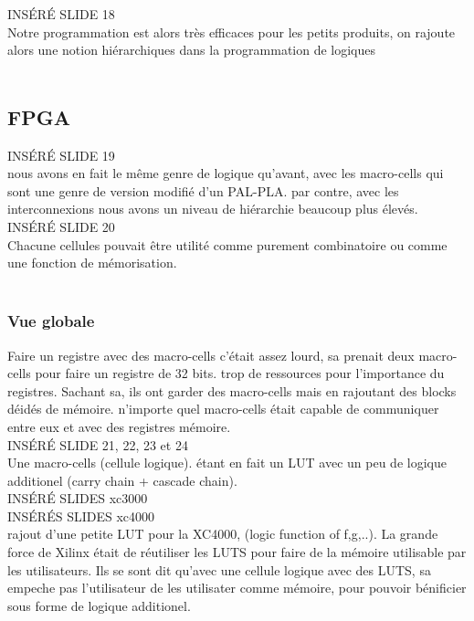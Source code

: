 \documentclass[oneside]{book}
\begin{document}
        INSÉRÉ SLIDE 18\\
        
        Notre programmation est alors très efficaces pour les petits produits, on rajoute alors une notion hiérarchiques dans la programmation de logiques\\
        \\
        \subsection{FPGA}
        INSÉRÉ SLIDE 19\\
        
        nous avons en fait le même genre de logique qu'avant, avec les macro-cells qui sont une genre de version modifié d'un PAL-PLA. par contre, avec les interconnexions nous avons un niveau de hiérarchie beaucoup plus élevés.\\
        
        INSÉRÉ SLIDE 20\\
        
        Chacune cellules pouvait être utilité comme purement combinatoire ou comme une fonction de mémorisation. \\
        \\
        \subsubsection{Vue globale}
        Faire un registre avec des macro-cells c'était assez lourd, sa prenait deux macro-cells pour faire un registre de 32 bits. trop de ressources pour l'importance du registres. Sachant sa, ils ont garder des macro-cells mais en rajoutant des blocks déidés de mémoire. n'importe quel macro-cells était capable de communiquer entre eux et avec des registres mémoire.\\
        
        INSÉRÉ SLIDE 21, 22, 23 et 24\\
        
        Une macro-cells (cellule logique). étant en fait un LUT avec un peu de logique additionel (carry chain + cascade chain). 
        \\
        
        INSÉRÉ SLIDES xc3000\\
        
        INSÉRÉS SLIDES xc4000\\
        
        rajout d'une petite LUT pour la XC4000, (logic function of f,g,..). La grande force de Xilinx était de réutiliser les LUTS pour faire de la mémoire utilisable par les utilisateurs. Ils se sont dit qu'avec une cellule logique avec des LUTS, sa empeche pas l'utilisateur de les utilisater comme mémoire, pour pouvoir bénificier sous forme de logique additionel.\\
        
\end{document}
